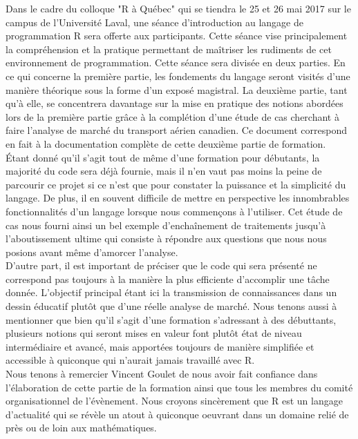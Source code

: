 Dans le cadre du colloque "R à Québec" qui se tiendra le 25 et 26 mai 2017 sur le campus de l'Université Laval, une séance d'introduction au langage de programmation R sera offerte aux participants. Cette séance vise principalement la compréhension et la pratique permettant de maîtriser les rudiments de cet environnement de programmation. \cite{RQC2017} Cette séance sera divisée en deux parties. En ce qui concerne la première partie, les fondements du langage seront visités d'une manière théorique sous la forme d'un exposé magistral. La deuxième partie, tant qu'à elle, se concentrera davantage sur la mise en pratique des notions abordées lors de la première partie grâce à la complétion d'une étude de cas cherchant à faire l'analyse de marché du transport aérien canadien. Ce document correspond en fait à la documentation complète de cette deuxième partie de formation. \\

Étant donné qu'il s'agit tout de même d'une formation pour débutants, la majorité du code sera déjà fournie, mais il n'en vaut pas moins la peine de parcourir ce projet si ce n'est que pour constater la puissance et la simplicité du langage. De plus, il en souvent difficile de mettre en perspective les innombrables fonctionnalités d'un langage lorsque nous commençons à l'utiliser. Cet étude de cas nous fourni ainsi un bel exemple d'enchaînement de traitements jusqu'à l'aboutissement ultime qui consiste à répondre aux questions que nous nous posions avant même d'amorcer l'analyse. \\

D'autre part, il est important de préciser que le code qui sera présenté ne correspond pas toujours à la manière la plus efficiente d'accomplir une tâche donnée. L'objectif principal étant ici la transmission de connaissances dans un dessin éducatif plutôt que d'une réelle analyse de marché. Nous tenons aussi à mentionner que bien qu'il s'agit d'une formation s'adressant à des débuttants, plusieurs notions qui seront mises en valeur font plutôt état de niveau intermédiaire et avancé, mais apportées toujours de manière simplifiée et accessible à quiconque qui n'aurait jamais travaillé avec R. \\

Nous tenons à remercier Vincent Goulet de nous avoir fait confiance dans l'élaboration de cette partie de la formation ainsi que tous les membres du comité organisationnel de l'évènement. Nous croyons sincèrement que R est un langage d'actualité qui se révèle un atout à quiconque oeuvrant dans un domaine relié de près ou de loin aux mathématiques. \\